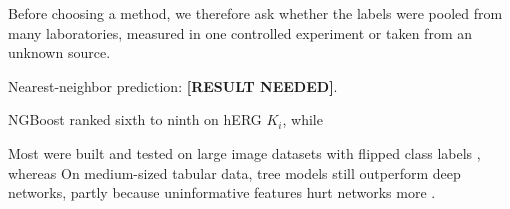 Before choosing a method, we therefore ask whether the labels were pooled from many laboratories, measured in one controlled experiment or taken from an unknown source.

Nearest-neighbor prediction: \textbf{[RESULT NEEDED]}.

NGBoost ranked sixth to ninth on hERG $K_i$, while

Most were built and tested on large image datasets with flipped class labels \citep{Song2022}, whereas
On medium-sized tabular data, tree models still outperform deep networks, partly because uninformative features hurt networks more \citep{Grinsztajn2022}.

